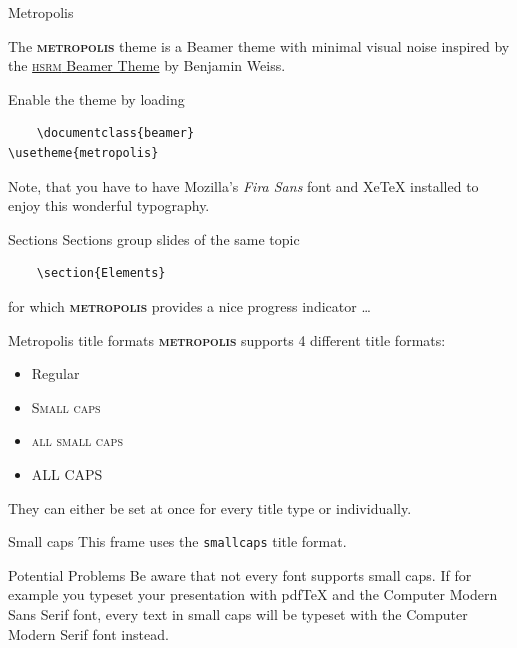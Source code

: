 \documentclass[10pt,spanish,xcolor={svgnames}]{beamer}
\newcommand{\themename}{\textbf{\textsc{metropolis}}\xspace}
\begin{document}
\begin{frame}[fragile]{Metropolis}

The \themename theme is a Beamer theme with minimal visual noise
inspired by the \href{https://github.com/hsrmbeamertheme/hsrmbeamertheme}{\textsc{hsrm} Beamer
Theme} by Benjamin Weiss.

Enable the theme by loading

\begin{verbatim}    \documentclass{beamer}
\usetheme{metropolis}\end{verbatim}

Note, that you have to have Mozilla's \emph{Fira Sans} font and XeTeX
installed to enjoy this wonderful typography.
\end{frame}
\begin{frame}[fragile]{Sections}
Sections group slides of the same topic

\begin{verbatim}    \section{Elements}\end{verbatim}

for which \themename provides a nice progress indicator \ldots
\end{frame}


\begin{frame}{Metropolis title formats}
\themename supports 4 different title formats:
\begin{itemize}
\item Regular
\item \textsc{Small caps}
\item \textsc{all small caps}
\item ALL CAPS
\end{itemize}
They can either be set at once for every title type or individually.
\end{frame}

{
\begin{frame}{Small caps}
This frame uses the \texttt{smallcaps} title format.

\begin{alertblock}{Potential Problems}
Be aware that not every font supports small caps. If for example you typeset your presentation with pdfTeX and the Computer Modern Sans Serif font, every text in small caps will be typeset with the Computer Modern Serif font instead.
\end{alertblock}
\end{frame}
}
\end{document}
